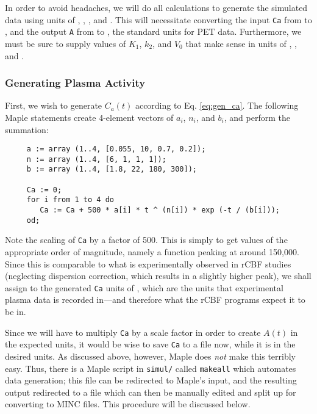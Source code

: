 In order to avoid headaches, we will do all calculations to generate
the simulated data using units of , ,
, and .  This will necessitate converting
the input \verb|Ca| from  to
, and the output \verb|A| from
 to
, the standard units for PET data.
Furthermore, we must be sure to supply values of $K_{1}$, $k_{2}$, and
$V_{0}$ that make sense in units of
, , and
.


\subsubsection{Generating Plasma Activity}

First, we wish to generate $C_{a}(t)$ according to Eq. \ref{eq:gen_ca}.  The
following Maple statements create 4-element vectors of $a_{i}$, $n_{i}$, and
$b_{i}$, and perform the summation:

\begin{verbatim}
     a := array (1..4, [0.055, 10, 0.7, 0.2]);
     n := array (1..4, [6, 1, 1, 1]);
     b := array (1..4, [1.8, 22, 180, 300]);

     Ca := 0;
     for i from 1 to 4 do
        Ca := Ca + 500 * a[i] * t ^ (n[i]) * exp (-t / (b[i]));
     od;
\end{verbatim}

Note the scaling of \verb|Ca| by a factor of 500.  This is simply to
get values of the appropriate order of magnitude, namely a function
peaking at around 150,000.  Since this is comparable to what is
experimentally observed in rCBF studies (neglecting dispersion
correction, which results in a slightly higher peak), we shall assign to the
generated \verb|Ca| units of ,
which are the units that experimental plasma data is recorded in---and
therefore what the rCBF programs expect it to be in.

Since we will have to multiply \verb|Ca| by a scale factor in order to
create $A(t)$ in the expected units, it would be wise to save
\verb|Ca| to a file now, while it is in the desired units.  As
discussed above, however, Maple does {\em not} make this terribly
easy.  Thus, there is a Maple script in
\verb|simul/| called \verb|makeall| which
automates data generation; this file can be redirected to Maple's
input, and the resulting output redirected to a file which can then be
manually edited and split up for converting to MINC files.  This
procedure will be discussed below.

